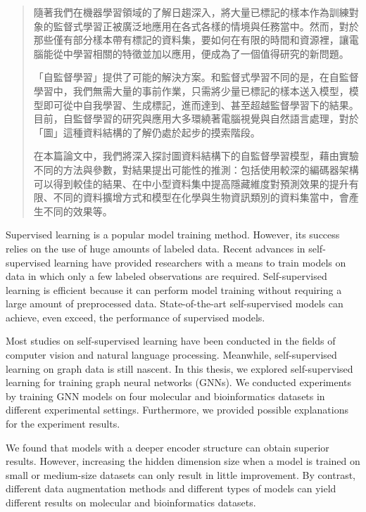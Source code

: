
\begin{abstract}

隨著我們在機器學習領域的了解日趨深入，將大量已標記的樣本作為訓練對象的監督式學習正被廣泛地應用在各式各樣的情境與任務當中。然而，對於那些僅有部分樣本帶有標記的資料集，要如何在有限的時間和資源裡，讓電腦能從中學習相關的特徵並加以應用，便成為了一個值得研究的新問題。

「自監督學習」提供了可能的解決方案。和監督式學習不同的是，在自監督學習中，我們無需大量的事前作業，只需將少量已標記的樣本送入模型，模型即可從中自我學習、生成標記，進而達到、甚至超越監督學習下的結果。目前，自監督學習的研究與應用大多環繞著電腦視覺與自然語言處理，對於「圖」這種資料結構的了解仍處於起步的摸索階段。

在本篇論文中，我們將深入探討圖資料結構下的自監督學習模型，藉由實驗不同的方法與參數，對結果提出可能性的推測：包括使用較深的編碼器架構可以得到較佳的結果、在中小型資料集中提高隱藏維度對預測效果的提升有限、不同的資料擴增方式和模型在化學與生物資訊類別的資料集當中，會產生不同的效果等。

\end{abstract}


\begin{abstract*}

Supervised learning is a popular model training method. However, its success relies on the use of huge amounts of labeled data. Recent advances in self-supervised learning have provided researchers with a means to train models on data in which only a few labeled observations are required. Self-supervised learning is efficient because it can perform model training without requiring a large amount of preprocessed data. State-of-the-art self-supervised models can achieve, even exceed, the performance of supervised models.

Most studies on self-supervised learning have been conducted in the fields of computer vision and natural language processing. Meanwhile, self-supervised learning on graph data is still nascent. In this thesis, we explored self-supervised learning for training graph neural networks (GNNs). We conducted experiments by training GNN models on four molecular and bioinformatics datasets in different experimental settings. Furthermore, we provided possible explanations for the experiment results. 

We found that models with a deeper encoder structure can obtain superior results. However, increasing the hidden dimension size when a model is trained on small or medium-size datasets can only result in little improvement. By contrast, different data augmentation methods and different types of models can yield different results on molecular and bioinformatics datasets.

\end{abstract*}
